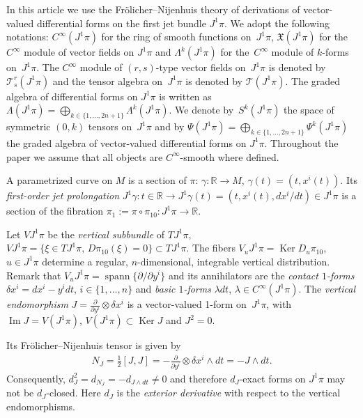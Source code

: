 \documentclass[11pt]{article}
\begin{document}
In this article we use the Fr\"olicher--Nijenhuis theory \cite{frolicher56,grifone00,KMS93}
of derivations of vector-valued dif\/ferential forms on the f\/irst jet
bundle $J^{1}\pi$. We adopt the following notations: $C^{\infty}(J^{1}\pi)$
for the ring of smooth functions on~$J^{1}\pi$, $\mathfrak{X}(J^{1}\pi)$
for the~$C^{\infty}$ module of vector f\/ields on $J^{1}\pi$ and $\Lambda^{k}(J^{1}\pi)$
for the~$C^{\infty}$ module of $k$-forms on~$J^{1}\pi$. The $C^{\infty}$
module of $(r,s)$-type vector f\/ields on~$J^{1}\pi$ is denoted by
$\mathcal{T}_{s}^{r}(J^{1}\pi)$ and the tensor algebra on~$J^{1}\pi$
is denoted by $\mathcal{T}(J^{1}\pi)$. The graded algebra of dif\/ferential
forms on $J^{1}\pi$ is written as $\Lambda(J^{1}\pi)=\bigoplus_{k\in \{1,\dots,2n+1\}}\Lambda^{k}(J^{1}\pi)$.
We denote by~$S^{k}(J^{1}\pi)$ the space of symmetric $(0,k)$ tensors
on~$J^{1}\pi$ and by $\Psi(J^{1}\pi)=\bigoplus_{k\in \{1,\dots,2n+1\}}\Psi^{k}(J^{1}\pi)$
the graded algebra of vector-valued dif\/ferential forms on $J^{1}\pi$.
Throughout the paper we assume that all objects are $C^{\infty}$-smooth
where def\/ined.

A parametrized curve on $M$ is a section of $\pi$: $\gamma:\mathbb{R}\rightarrow M$,
$\gamma(t)=(t,x^{i}(t))$. Its \emph{first-order jet prolongation}
$J^{1}\gamma:t\in\mathbb{R}\rightarrow J^{1}\gamma(t)=\left(t,x^{i}(t),dx^{i}/dt\right)\in J^{1}\pi$
is a section of the f\/ibration $\pi_{1}:=\pi\circ\pi_{10}:  J^{1}\pi\rightarrow\mathbb{R}$.

Let $VJ^{1}\pi$ be the \emph{vertical subbundle} of $TJ^{1}\pi,$
$VJ^{1}\pi=\{\xi\in TJ^{1}\pi,\,  D\pi_{10}(\xi)=0\}\subset TJ^{1}\pi$.
The f\/ibers $V_{u}J^{1}\pi=\operatorname{Ker} D_{u}\pi_{10}$, $u\in J^{1}\pi$ determine
a regular, $n$-dimensional, integrable vertical distribution. Remark
that $V_{u}J^{1}\pi=\operatorname{spann}\{\partial/\partial y^{i}\}$
and its annihilators are the \emph{contact $1$-forms} $\delta x^{i}=dx^{i}-y^{i}dt$, $i\in \{1,\dots,n\}$
and \emph{basic $1$-forms} $\lambda dt$, $\lambda\in C^{\infty}(J^{1}\pi)$.
The \emph{vertical endomorphism} $J=\frac{\partial}{\partial y^{i}}\otimes\delta x^{i}$
is a vector-valued 1-form on~$J^{1}\pi$, with $\operatorname{Im}J=V(J^{1}\pi)$,
$V(J^{1}\pi)\subset\operatorname{Ker}J$ and $J^{2}=0$.

Its Fr\"olicher--Nijenhuis tensor is given by
\begin{gather*}
N_{J}=\frac{1}{2}[J,J]=-\frac{\partial}{\partial y^{i}}\otimes\delta x^{i}\wedge dt=-J\wedge dt.
\end{gather*}
 Consequently, $d_{J}^{2}=d_{N_{J}}=-d_{J\wedge dt}\neq0$ and therefore
$d_{J}$-exact forms on $J^{1}\pi$ may not be $d_{J}$-closed. Here
$d_{J}$ is the \emph{exterior derivative} with respect to the vertical
endomorphisms.
\end{document}
